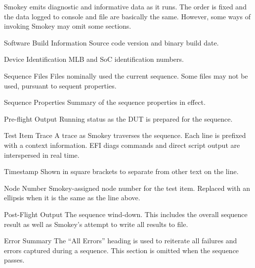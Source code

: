 Smokey emits diagnostic and informative data as it runs.  The order is fixed
and the data logged to console and file are basically the same.  However, some
ways of invoking Smokey may omit some sections.

\begin{LogSection}

	\item[Software Build Information] Source code version and binary build
	date.

	\item[Device Identification] MLB and SoC identification numbers.

	\item[Sequence Files] Files nominally used the current sequence.  Some
	files may not be used, pursuant to sequent properties.

	\item[Sequence Properties] Summary of the sequence properties in
	effect.

	\item[Pre-flight Output] Running status as the DUT is prepared for the
	sequence.

	\item[Test Item Trace] A trace as Smokey traverses the sequence.  Each
	line is prefixed with a context information.  EFI diags commands and
	direct script output are interspersed in real time.

	\begin{Definition}

		\item[Timestamp] Shown in square brackets to separate from
		other text on the line.

		\item[Node Number] Smokey-assigned node number for the test
		item.  Replaced with an ellipsis when it is the same as the
		line above.

	\end{Definition}

	\item[Post-Flight Output] The sequence wind-down.  This includes the
	overall sequence result as well as Smokey's attempt to write all
	results to file.

	\item[Error Summary] The ``All Errors'' heading is used to reiterate
	all failures and errors captured during a sequence.  This section is
	omitted when the sequence passes.

\end{LogSection}

